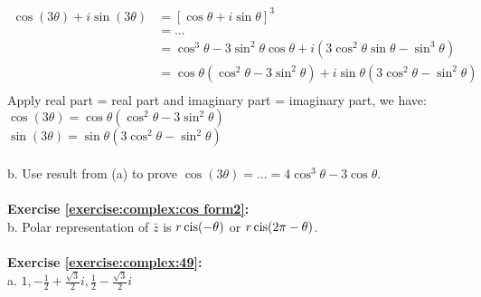 \begin{align*}
\cos(3\theta)+i\sin(3\theta) & =[\cos\theta+i\sin\theta]^{3}\\
& = ...\\
& = \cos^{3}\theta-3\sin^{2}\theta\cos\theta+i(3\cos^{2}\theta\sin\theta-\sin^{3}\theta)\\
& = \cos\theta(\cos^{2}\theta-3\sin^{2}\theta)+i\sin\theta(3\cos^{2}\theta-\sin^{2}\theta)\\
\end{align*}
Apply real part = real part and imaginary part = imaginary part, we have:\\
$\cos(3\theta)=\cos\theta(\cos^{2}\theta-3\sin^{2}\theta)$\\
$\sin(3\theta)=\sin\theta(3\cos^{2}\theta-\sin^{2}\theta)$\\
\\
b. Use result from (a) to prove $\cos(3\theta)=...=4\cos^{3}\theta-3\cos\theta $.\\
\\
\textbf{Exercise \ref{exercise:complex:cos form2}:}\\
b. Polar representation of $\bar{z}$ is $r\operatorname{cis}(-\theta)$ or $r\operatorname{cis}(2\pi-\theta)$.\\
\\
\textbf{Exercise \ref{exercise:complex:49}:}\\
a. $1, -\displaystyle\frac{1}{2}+\displaystyle\frac{\sqrt{3}}{2}i, \displaystyle\frac{1}{2}-\displaystyle\frac{\sqrt{3}}{2}i$\\
\\
